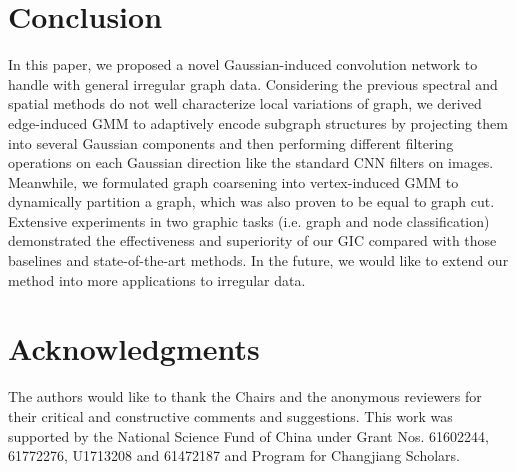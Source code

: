 \documentclass[letterpaper]{article} \usepackage{aaai19}  \usepackage{times}  \usepackage{helvet}  \usepackage{courier}  \usepackage{url}  \usepackage{graphicx}  \frenchspacing  \setlength{\pdfpagewidth}{8.5in}  \setlength{\pdfpageheight}{11in}
\begin{document}
\section{Conclusion}
In this paper, we proposed a novel Gaussian-induced convolution network to handle with general irregular graph data. Considering the previous spectral and spatial methods do not well characterize local variations of graph, we derived edge-induced GMM to adaptively encode subgraph structures by projecting them into several Gaussian components and then performing different filtering operations on each Gaussian direction like the standard CNN filters on images. Meanwhile, we formulated graph coarsening into vertex-induced GMM to dynamically partition a graph, which was also proven to be equal to graph cut. Extensive experiments in two graphic tasks (i.e. graph and node classification) demonstrated the effectiveness and superiority of our GIC compared with those baselines and state-of-the-art methods. In the future, we would like to extend our method into more applications to irregular data.


\section{Acknowledgments}
The authors would like to thank the Chairs and the anonymous reviewers for their critical and constructive comments and suggestions. This work was supported by the National Science Fund of China under Grant Nos. 61602244, 61772276, U1713208 and 61472187 and Program for Changjiang Scholars.
 

\small


\end{document}

